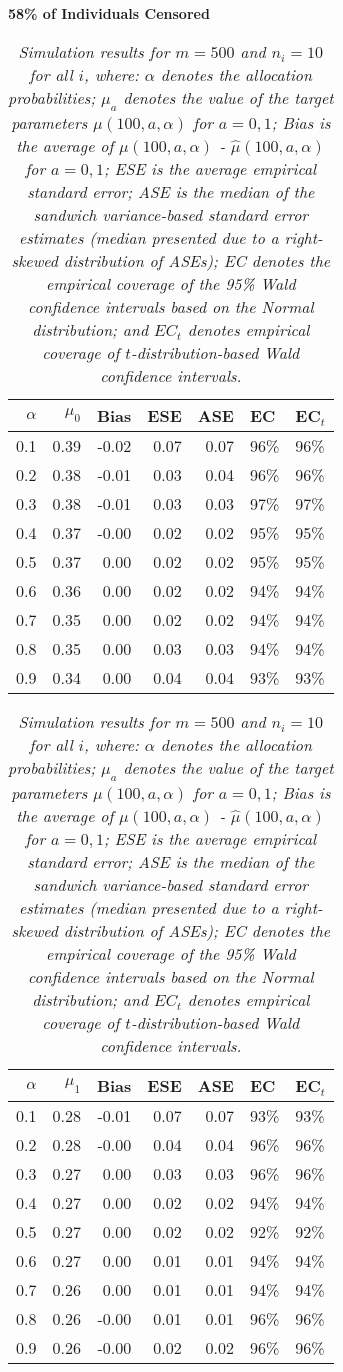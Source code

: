\documentclass[12pt, letterpaper]{article}
\begin{document}
\begin{center}
	\textbf{58\% of Individuals Censored} 
\end{center}  
\begin{table}[ht!]
	\centering
	\bgroup
	\def\arraystretch{1.25}
	\setlength\tabcolsep{0.05in}
	\begin{tabular}{rrrrrll}
		\hline
		$\alpha$ & $\mu_0$ & Bias & ESE & ASE & EC & EC$_t$ \\ \hline
		0.1 & 0.39 & -0.02 & 0.07 & 0.07 & 96\% & 96\% \\ 
		0.2 & 0.38 & -0.01 & 0.03 & 0.04 & 96\% & 96\% \\ 
		0.3 & 0.38 & -0.01 & 0.03 & 0.03 & 97\% & 97\% \\ 
		0.4 & 0.37 & -0.00 & 0.02 & 0.02 & 95\% & 95\% \\ 
		0.5 & 0.37 & 0.00 & 0.02 & 0.02 & 95\% & 95\% \\ 
		0.6 & 0.36 & 0.00 & 0.02 & 0.02 & 94\% & 94\% \\ 
		0.7 & 0.35 & 0.00 & 0.02 & 0.02 & 94\% & 94\% \\ 
		0.8 & 0.35 & 0.00 & 0.03 & 0.03 & 94\% & 94\% \\ 
		0.9 & 0.34 & 0.00 & 0.04 & 0.04 & 93\% & 93\% \\ 
		\hline
	\end{tabular}
	\egroup
	\quad 
	\bgroup
	\setlength\tabcolsep{0.05in}
	\def\arraystretch{1.25}
	\begin{tabular}{rrrrrll}
		\hline  
		$\alpha$ & $\mu_1$ & Bias & ESE & ASE & EC & EC$_t$ \\ \hline
		0.1 & 0.28 & -0.01 & 0.07 & 0.07 & 93\% & 93\% \\ 
		0.2 & 0.28 & -0.00 & 0.04 & 0.04 & 96\% & 96\% \\ 
		0.3 & 0.27 & 0.00 & 0.03 & 0.03 & 96\% & 96\% \\ 
		0.4 & 0.27 & 0.00 & 0.02 & 0.02 & 94\% & 94\% \\ 
		0.5 & 0.27 & 0.00 & 0.02 & 0.02 & 92\% & 92\% \\ 
		0.6 & 0.27 & 0.00 & 0.01 & 0.01 & 94\% & 94\% \\ 
		0.7 & 0.26 & 0.00 & 0.01 & 0.01 & 94\% & 94\% \\ 
		0.8 & 0.26 & -0.00 & 0.01 & 0.01 & 96\% & 96\% \\ 
		0.9 & 0.26 & -0.00 & 0.02 & 0.02 & 96\% & 96\% \\ 
		\hline
	\end{tabular}
	\egroup
	\caption*{\textit{Simulation results for $m = 500$ and $n_i = 10$ for all $i$, where: $\alpha$ denotes the allocation probabilities; $\mu_a$ denotes the value of the target parameters $\mu(100, a, \alpha)$ for $a=0,1$; Bias is the average of $\mu(100, a, \alpha)$ - $\hat{\mu}(100, a, \alpha)$ for $a=0, 1$; ESE is the average empirical standard error; ASE is the median of the sandwich variance-based standard error estimates (median presented due to a right-skewed distribution of ASEs); EC denotes the empirical coverage of the 95\% Wald confidence intervals based on the Normal distribution; and $EC_t$ denotes empirical coverage of $t$-distribution-based Wald confidence intervals.} \\
		
}
\end{table}
\end{document}
